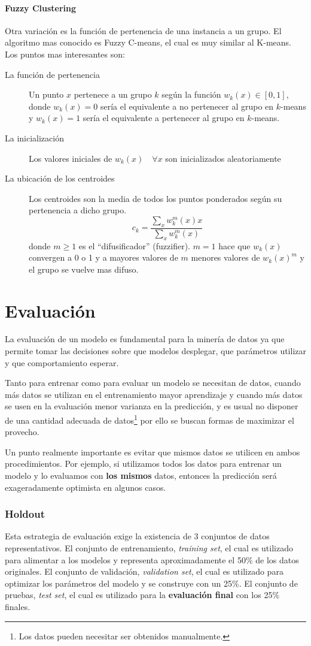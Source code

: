 \documentclass[10pt,a4paper]{article}
\begin{document}
\subsection{Fuzzy Clustering}
Otra variación es la función de pertenencia de una instancia a un grupo. El algoritmo mas conocido es Fuzzy C-means, el cual es muy similar al K-means\cite{bezdek1984fcm}. Los puntos mas interesantes son:
\begin{description}
\item[La función de pertenencia] Un punto $x$ pertenece a un grupo $k$ según la función $w_k(x) \in [0, 1]$, donde $w_k(x) = 0$ sería el equivalente a no pertenecer al grupo en $k$-means y $w_k(x) = 1$ sería el equivalente a pertenecer al grupo en $k$-means.
\item[La inicialización] Los valores iniciales de $w_k(x)\quad \forall x$ son inicializados aleatoriamente
\item[La ubicación de los centroides] Los centroides son la media de todos los puntos ponderados según su pertenencia a dicho grupo.
  \[
  c_k = \frac{\sum_x w_k^m(x)x}{\sum_x w_k^m(x)}
  \]
  donde $m \geq 1$ es el ``difusificador'' (fuzzifier). $m=1$ hace que $w_k(x)$ convergen a 0 o 1 y a mayores valores de $m$ menores valores de $w_k(x)^m$ y el grupo se vuelve mas difuso.
\end{description}

\part{Evaluación}
La evaluación de un modelo es fundamental para la minería de datos ya que permite tomar las decisiones sobre que modelos desplegar, que parámetros utilizar y que comportamiento esperar.

Tanto para entrenar como para evaluar un modelo se necesitan de datos, cuando más datos se utilizan en el entrenamiento mayor aprendizaje y cuando más datos se usen en la evaluación menor varianza en la predicción, y es usual no disponer de una cantidad adecuada de datos\footnote{Los datos pueden necesitar ser obtenidos manualmente.} por ello se buscan formas de maximizar el provecho.

Un punto realmente importante es evitar que mismos datos se utilicen en ambos procedimientos. Por ejemplo, si utilizamos todos los datos para entrenar un modelo y lo evaluamos con \textbf{los mismos} datos, entonces la predicción será exageradamente optimista en algunos casos. 

\section{Holdout}
Esta estrategia de evaluación exige la existencia de 3 conjuntos de datos representativos. El conjunto de entrenamiento, \textit{training set}, el cual es utilizado para alimentar a los modelos y representa aproximadamente el 50\% de los datos originales. El conjunto de validación, \textit{validation set}, el cual es utilizado para optimizar los parámetros del modelo y se construye con un 25\%. El conjunto de pruebas, \textit{test set}, el cual es utilizado para la \textbf{evaluación final} con los 25\% finales.
\end{document}
